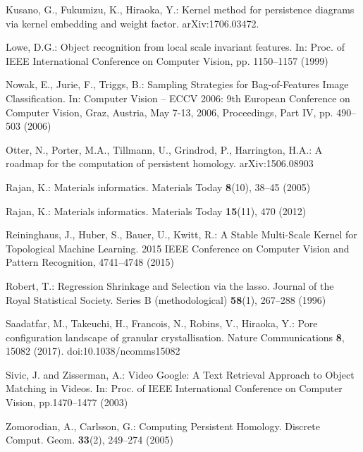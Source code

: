 \documentclass[smallextended]{svjour3}
\begin{document}
\begin{thebibliography}{99}
  Kusano, G., Fukumizu, K., Hiraoka, Y.: Kernel method for persistence diagrams via kernel embedding and weight factor.  arXiv:1706.03472.

  
  


  
  Lowe, D.G.: Object recognition from local scale invariant features.
  In: Proc. of IEEE International Conference on Computer Vision, pp. 1150--1157
  (1999)

  Nowak, E., Jurie, F., Triggs, B.:
  Sampling Strategies for Bag-of-Features Image Classification.
  In: Computer Vision -- ECCV 2006: 9th European Conference on Computer Vision, Graz, Austria, May 7-13, 2006, Proceedings, Part IV, pp. 490--503 (2006)

  Otter, N., Porter, M.A., Tillmann, U., Grindrod, P., Harrington, H.A.:
  A roadmap for the computation of persistent homology.
  arXiv:1506.08903

  
  Rajan, K.: Materials informatics. Materials Today \textbf{8}(10), 38--45 (2005)

  Rajan, K.: Materials informatics. Materials Today \textbf{15}(11), 470 (2012)

  Reininghaus, J., Huber, S., Bauer, U., Kwitt, R.:
  A Stable Multi-Scale Kernel for Topological Machine Learning.
  2015 IEEE Conference on Computer Vision and Pattern Recognition, 4741--4748 (2015)




  Robert, T.:
  Regression Shrinkage and Selection via the lasso.
  Journal of the Royal Statistical Society. Series B (methodological) \textbf{58}(1),
  267--288 (1996)

  Saadatfar, M., Takeuchi, H., Francois, N., Robins, V., Hiraoka, Y.:
  Pore configuration landscape of granular crystallisation.
  Nature Communications \textbf{8}, 15082 (2017).
  doi:10.1038/ncomms15082



  Sivic, J. and Zisserman, A.: Video Google: A Text Retrieval
  Approach to Object Matching in Videos.
  In: Proc. of IEEE International
  Conference on Computer Vision, pp.1470--1477 (2003)


  Zomorodian, A., Carlsson, G.:
  Computing Persistent Homology.
  Discrete Comput. Geom. \textbf{33}(2), 249--274 (2005)

\end{thebibliography}
\end{document}
